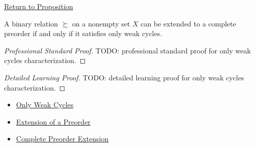\newpage
{}
\label{prf:owc-characterization}

\begin{remark*}[Return]
\hyperref[prop:owc-characterization]{Return to Proposition}
\end{remark*}

\begin{proposition*}
A binary relation $\succsim$ on a nonempty set $X$ can be extended to a
complete preorder if and only if it satisfies only weak cycles.
\end{proposition*}

\begin{proof}[Professional Standard Proof]
\LRAProofBodyStart
TODO: professional standard proof for only weak cycles characterization.
\end{proof}

\begin{proof}[Detailed Learning Proof]
\LRAProofBodyStart
TODO: detailed learning proof for only weak cycles characterization.
\end{proof}

\begin{remark*}
\end{remark*}

\begin{dependencies}
\begin{itemize}
  \item \hyperref[def:owc]{Only Weak Cycles}
  \item \hyperref[def:preorder-extension]{Extension of a Preorder}
  \item \hyperref[cor:complete-preorder-extension]{Complete Preorder Extension}
\end{itemize}
\end{dependencies}

\clearpage
